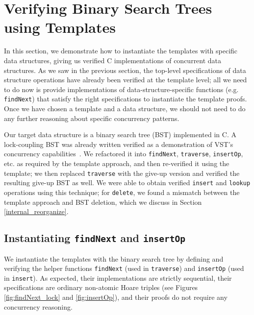 \documentclass[sigplan,10pt, screen]{acmart}
\begin{document}
\section{Verifying Binary Search Trees using Templates}
\label{BST_proof}
In this section, we demonstrate how to instantiate the templates with specific data structures, giving us verified C implementations of concurrent data structures. 
As we saw in the previous section, the top-level specifications of data structure operations have already been verified at the template level; all we need to do now is provide implementations of data-structure-specific functions (e.g. \lstinline{findNext}) that satisfy the right specifications to instantiate the template proofs. Once we have chosen a template and a data structure, we should not need to do any further reasoning about specific concurrency patterns.

Our target data structure is a binary search tree (BST) implemented in C. A lock-coupling BST was already written verified as a demonstration of VST's concurrency capabilities~\cite{bst-conc}. We refactored it into \lstinline{findNext}, \lstinline{traverse}, \lstinline{insertOp}, etc. as required by the template approach, and then re-verified it using the template; we then replaced \lstinline{traverse} with the give-up version and verified the resulting give-up BST as well. We were able to obtain verified \lstinline{insert} and \lstinline{lookup} operations using this technique; for \texttt{delete}, we found a mismatch between the template approach and BST deletion, which we discuss in Section \ref{internal_reorganize}.

\subsection{Instantiating \lstinline{findNext} and \lstinline{insertOp}}
We instantiate the templates with the binary search tree by defining and verifying the helper functions \texttt{findNext} (used in \lstinline{traverse}) and \texttt{insertOp} (used in \texttt{insert}). As expected, their implementations are strictly sequential, their specifications are ordinary non-atomic Hoare triples (see Figures \ref{fig:findNext_lock} and \ref{fig:insertOp}), and their proofs do not require any concurrency reasoning.
\end{document}
